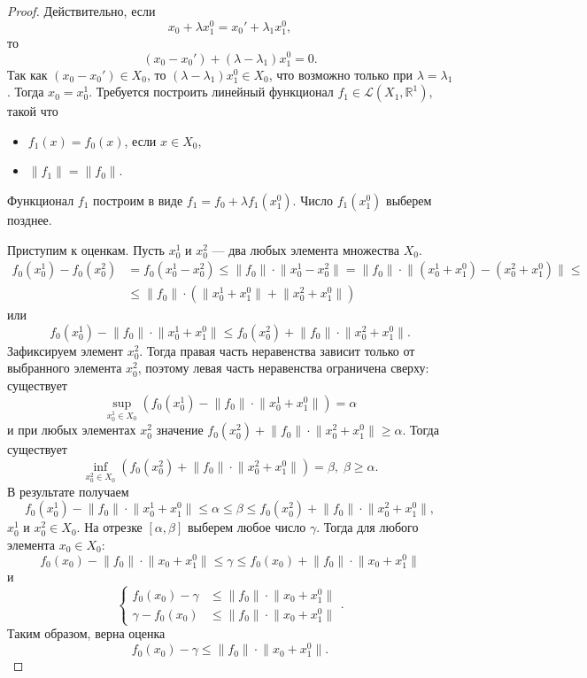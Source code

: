 \documentclass[12pt,a4paper,titlepage,oneside]{book}
\theoremstyle{definition}
\theoremstyle{plain}
\theoremstyle{break}
\theoremstyle{remark}
\theoremstyle{remark}
\theoremstyle{remark}
\theoremstyle{remark}
\theoremstyle{plain}
\theoremstyle{plain}
\begin{document}
\begin{proof}
Действительно, если $$x_0+\lambda x_1^0=x_0'+\lambda_1 x_1^0,$$ то $$(x_0-x_0')+(\lambda-\lambda_1)x_1^0=0.$$
Так как $(x_0-x_0') \in X_0$, то $(\lambda-\lambda_1)x_1^0 \in X_0$, что возможно только при $\lambda=\lambda_1$. Тогда $x_0=x_0^1$.
Требуется построить линейный функционал $f_1 \in \mathcal{L}(X_1, \mathbb{R}^1)$, такой что
\begin{itemize}
	\item $f_1(x)=f_0(x)$, если $x\in X_0$,
	\item $\lVert f_1 \rVert=\lVert f_0 \rVert$.
\end{itemize}
Функционал $f_1$ построим в виде $f_1=f_0+\lambda f_1(x_1^0)$. Число $f_1(x_1^0)$ выберем позднее.

Приступим к оценкам. Пусть $x_0^1$ и $x_0^2$ --- два любых элемента множества $X_0$.
\begin{align*}
f_0(x_0^1)-f_0(x_0^2) &= f_0(x_0^1-x_0^2) \leqslant \lVert f_0 \rVert \cdot \lVert x_0^1-x_0^2 \rVert = \lVert f_0 \rVert \cdot \lVert (x_0^1+x_1^0)-(x_0^2+x_1^0) \rVert \leqslant \\
&\leqslant \lVert f_0 \rVert \cdot (\lVert x_0^1+x_1^0 \rVert + \lVert x_0^2+x_1^0 \rVert)
\end{align*}
или
$$f_0(x_0^1)-\lVert f_0 \rVert \cdot \lVert x_0^1+x_1^0 \rVert \leqslant f_0(x_0^2)+\lVert f_0 \rVert \cdot \lVert x_0^2+x_1^0 \rVert.$$
Зафиксируем элемент $x_0^2$. Тогда правая часть неравенства зависит только от выбранного элемента $x_0^2$, поэтому левая часть неравенства ограничена сверху: существует
$$\underset{x_0^1 \in X_0}{\sup}\left( f_0(x_0^1)-\lVert f_0 \rVert \cdot \lVert x_0^1+x_1^0 \rVert \right)=\alpha$$
и при любых элементах $x_0^2$ значение $f_0(x_0^2)+\lVert f_0 \rVert \cdot \lVert x_0^2+x_1^0 \rVert \geqslant \alpha$.
Тогда существует $$\underset{x_0^2 \in X_0}{\inf}\left(f_0(x_0^2)+\lVert f_0 \rVert \cdot \lVert x_0^2+x_1^0 \rVert \right)=\beta, \; \beta \geqslant  \alpha .$$
В результате получаем
$$f_0(x_0^1)-\lVert f_0 \rVert \cdot \lVert x_0^1+x_1^0 \rVert \leqslant \alpha \leqslant \beta \leqslant f_0(x_0^2)+\lVert f_0 \rVert \cdot \lVert x_0^2+x_1^0 \rVert,$$
$x_0^1$ и $x_0^2 \in X_0$.
На отрезке $[\alpha, \beta]$ выберем любое число $\gamma$. Тогда для любого элемента $x_0 \in X_0$:
$$f_0(x_0)-\lVert f_0 \rVert \cdot \lVert x_0+x_1^0 \rVert \leqslant \gamma \leqslant f_0(x_0)+\lVert f_0 \rVert \cdot \lVert x_0+x_1^0 \rVert$$
и
$$
\begin{cases}
    f_0(x_0)-\gamma &\leqslant \lVert f_0 \rVert \cdot \lVert x_0+x_1^0 \rVert\\
    \gamma - f_0(x_0) &\leqslant \lVert f_0 \rVert \cdot \lVert x_0+x_1^0 \rVert
\end{cases}.
$$
Таким образом, верна оценка
\begin{equation}
\label{32_1}
f_0(x_0)-\gamma \leqslant \lVert f_0 \rVert \cdot \lVert x_0+x_1^0 \rVert.
\end{equation}


\end{proof}
\end{document}
